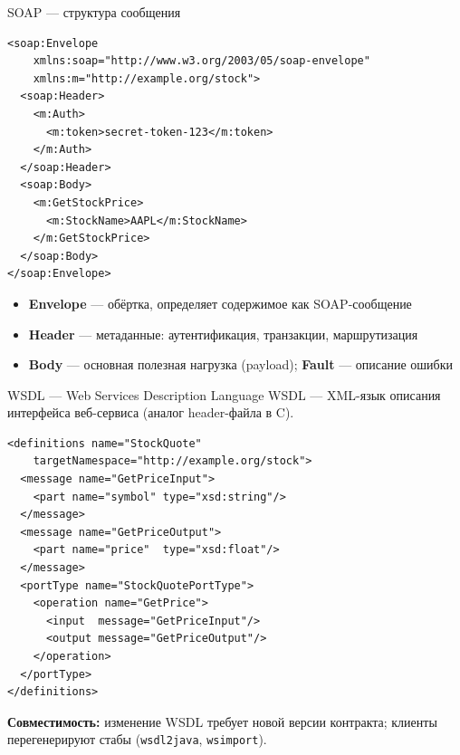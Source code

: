\documentclass{beamer}
\begin{document}
\begin{frame}[fragile]{SOAP --- структура сообщения}
\begin{verbatim}
<soap:Envelope
    xmlns:soap="http://www.w3.org/2003/05/soap-envelope"
    xmlns:m="http://example.org/stock">
  <soap:Header>
    <m:Auth>
      <m:token>secret-token-123</m:token>
    </m:Auth>
  </soap:Header>
  <soap:Body>
    <m:GetStockPrice>
      <m:StockName>AAPL</m:StockName>
    </m:GetStockPrice>
  </soap:Body>
</soap:Envelope>
\end{verbatim}
\begin{itemize}
  \item \textbf{Envelope} --- обёртка, определяет содержимое как SOAP-сообщение
  \item \textbf{Header} --- метаданные: аутентификация, транзакции, маршрутизация
  \item \textbf{Body} --- основная полезная нагрузка (payload); \textbf{Fault} --- описание ошибки
\end{itemize}
\end{frame}

\begin{frame}[fragile]{WSDL --- Web Services Description Language}
WSDL --- XML-язык описания интерфейса веб-сервиса (аналог header-файла в C).
\begin{verbatim}
<definitions name="StockQuote"
    targetNamespace="http://example.org/stock">
  <message name="GetPriceInput">
    <part name="symbol" type="xsd:string"/>
  </message>
  <message name="GetPriceOutput">
    <part name="price"  type="xsd:float"/>
  </message>
  <portType name="StockQuotePortType">
    <operation name="GetPrice">
      <input  message="GetPriceInput"/>
      <output message="GetPriceOutput"/>
    </operation>
  </portType>
</definitions>
\end{verbatim}
\textbf{Совместимость:} изменение WSDL требует новой версии контракта; клиенты перегенерируют стабы (\texttt{wsdl2java}, \texttt{wsimport}).
\end{frame}
\end{document}
